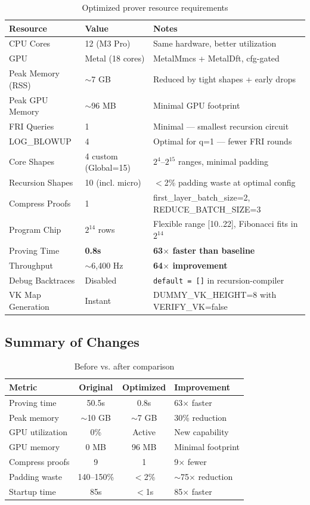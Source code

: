 \documentclass[11pt,a4paper]{article}
\begin{document}
\begin{table}[h]
\centering
\begin{tabular}{@{}L{3.5cm}L{3cm}L{7cm}@{}}
\toprule
\textbf{Resource} & \textbf{Value} & \textbf{Notes} \\
\midrule
CPU Cores & 12 (M3 Pro) & Same hardware, better utilization \\
GPU & Metal (18 cores) & MetalMmcs + MetalDft, cfg-gated \\
Peak Memory (RSS) & $\sim$7 GB & Reduced by tight shapes + early drops \\
Peak GPU Memory & $\sim$96 MB & Minimal GPU footprint \\
FRI Queries & 1 & Minimal --- smallest recursion circuit \\
LOG\_BLOWUP & 4 & Optimal for q=1 --- fewer FRI rounds \\
Core Shapes & 4 custom (Global=15) & $2^4$--$2^{15}$ ranges, minimal padding \\
Recursion Shapes & 10 (incl. micro) & $<$2\% padding waste at optimal config \\
Compress Proofs & 1 & first\_layer\_batch\_size=2, REDUCE\_BATCH\_SIZE=3 \\
Program Chip & $2^{14}$ rows & Flexible range {[10..22]}, Fibonacci fits in $2^{14}$ \\
Proving Time & \textbf{0.8s} & \textbf{63$\times$ faster than baseline} \\
Throughput & $\sim$6,400 Hz & \textbf{64$\times$ improvement} \\
Debug Backtraces & Disabled & \texttt{default = []} in recursion-compiler \\
VK Map Generation & Instant & DUMMY\_VK\_HEIGHT=8 with VERIFY\_VK=false \\
\bottomrule
\end{tabular}
\caption{Optimized prover resource requirements}
\end{table}

\subsection{Summary of Changes}

\begin{table}[h]
\centering
\begin{tabular}{@{}lccl@{}}
\toprule
\textbf{Metric} & \textbf{Original} & \textbf{Optimized} & \textbf{Improvement} \\
\midrule
Proving time & 50.5s & 0.8s & 63$\times$ faster \\
Peak memory & $\sim$10 GB & $\sim$7 GB & 30\% reduction \\
GPU utilization & 0\% & Active & New capability \\
GPU memory & 0 MB & 96 MB & Minimal footprint \\
Compress proofs & 9 & 1 & 9$\times$ fewer \\
Padding waste & 140--150\% & $<$2\% & $\sim$75$\times$ reduction \\
Startup time & 85s & $<$1s & 85$\times$ faster \\
\bottomrule
\end{tabular}
\caption{Before vs. after comparison}
\end{table}
\end{document}
